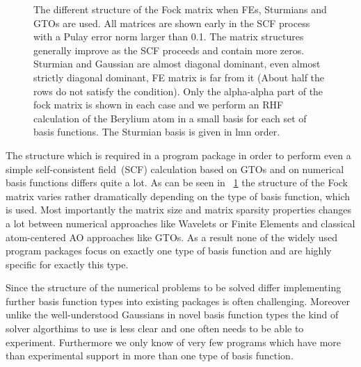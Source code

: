\begin{figure}
	\centering
	\caption{The different structure of the Fock matrix when FEs,
		Sturmians and GTOs are used.
		All matrices are shown early in the SCF process with a Pulay error norm
		larger than 0.1.
		The matrix structures generally improve as the SCF proceeds and contain more zeros.
		Sturmian and Gaussian are almost diagonal dominant,
		even almost strictly diagonal dominant,
		FE matrix is far from it (About half the rows do not satisfy the condition).
		Only the alpha-alpha part of the fock matrix is shown in each case
		and we perform an RHF calculation of the Berylium atom in a small basis
		for each set of basis functions.
		The Sturmian basis is given in lmn order.
	}
	\label{fig:FockStructure}
\end{figure}

The structure which is required in a program package in order to perform even a simple
self-consistent field~(SCF) calculation
based on GTOs and on numerical basis functions differs quite a lot.
As can be seen in \fig~\ref{fig:FockStructure} the structure of the Fock matrix
varies rather dramatically depending on the type of basis function,
which is used.
Most importantly the matrix size and matrix sparsity properties
changes a lot between numerical approaches like
Wavelets or Finite Elements and classical atom-centered AO approaches like GTOs.
As a result none of the widely used program packages
focus on exactly one type of basis function and are highly specific for exactly this type.

Since the structure of the numerical problems to be solved differ
implementing further basis function types into existing packages
is often challenging.
Moreover unlike the well-understood Gaussians in novel basis function types
the kind of solver algorthims to use is less clear and one often needs to be able to experiment.
Furthermore we only know of very few programs which have more than experimental
support in more than one type of basis function.

